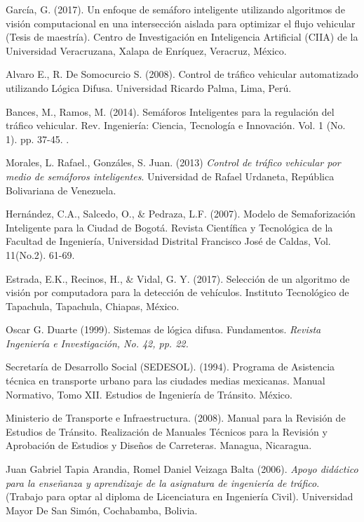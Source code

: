 \begin{thebibliography}{99}
	
	 García, G. (2017). Un enfoque de semáforo inteligente utilizando algoritmos de visión computacional en una intersección aislada para optimizar el flujo vehicular (Tesis de maestría). Centro de Investigación en Inteligencia Artificial (CIIA) de la Universidad Veracruzana, Xalapa de Enríquez, Veracruz, México. 
	
	 Alvaro E., R. De Somocurcio S. (2008). Control de tráfico vehicular automatizado utilizando Lógica Difusa. Universidad Ricardo Palma, Lima, Perú.
	
	 Bances, M., Ramos, M. (2014). Semáforos Inteligentes para la regulación del tráfico vehicular. Rev. Ingeniería: Ciencia, Tecnología e Innovación. Vol. 1 (No. 1). pp. 37-45. .
	
	 Morales, L. Rafael., Gonzáles, S. Juan. (2013) \emph{Control de tráfico vehicular por medio de semáforos inteligentes}. Universidad de Rafael Urdaneta, República Bolivariana de Venezuela.  
	
	 Hernández, C.A., Salcedo, O., \& Pedraza, L.F. (2007). Modelo de Semaforización Inteligente para la Ciudad de Bogotá. Revista Científica y Tecnológica de la Facultad de Ingeniería, Universidad Distrital Francisco José de Caldas, Vol. 11(No.2). 61-69. 
	
	 Estrada, E.K., Recinos, H., \& Vidal, G. Y. (2017). Selección de un algoritmo de visión por computadora para la detección de vehículos. Instituto Tecnológico de Tapachula, Tapachula, Chiapas, México.
	
	 Oscar G. Duarte (1999). Sistemas de lógica difusa. Fundamentos. \textit{Revista Ingeniería e Investigación, No. 42, pp. 22.}
	
	 Secretaría de Desarrollo Social (SEDESOL). (1994). Programa de Asistencia técnica en transporte urbano para las ciudades medias mexicanas. Manual Normativo, Tomo XII. Estudios de Ingeniería de Tránsito. México.
	
	 Ministerio de Transporte e Infraestructura. (2008). Manual para la Revisión de Estudios de Tránsito. Realización de Manuales Técnicos para la Revisión y Aprobación de Estudios y Diseños de Carreteras. Managua, Nicaragua.
	
	 Juan Gabriel Tapia Arandia, Romel Daniel Veizaga Balta (2006).
		\emph{Apoyo didáctico para la enseñanza y aprendizaje de la asignatura de ingeniería de tráfico}.
		(Trabajo para optar al diploma de Licenciatura en Ingeniería Civil).
		Universidad Mayor De San Simón, Cochabamba, Bolivia.
	

\end{thebibliography}
